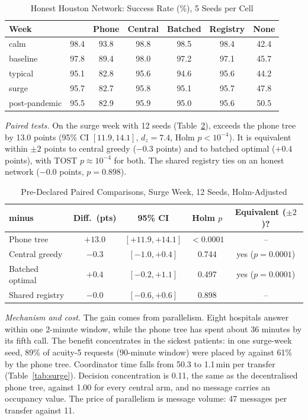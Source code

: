 \begin{table}[!t]
\centering
\caption{Honest Houston Network: Success Rate (\%), 5 Seeds per Cell}
\label{tab:honest}
\scriptsize
\setlength{\tabcolsep}{2.5pt}
\begin{tabular}{@{}lcccccc@{}}
\toprule
Week & \mahros{} & Phone & Central & Batched & Registry & None \\
\midrule
calm          & 98.4 & 93.8 & 98.8 & 98.5 & 98.4 & 42.4 \\
baseline      & 97.8 & 89.4 & 98.0 & 97.2 & 97.1 & 45.7 \\
typical       & 95.1 & 82.8 & 95.6 & 94.6 & 95.6 & 44.2 \\
surge         & 95.7 & 82.7 & 95.8 & 95.1 & 95.7 & 47.8 \\
post-pandemic & 95.5 & 82.9 & 95.9 & 95.0 & 95.6 & 50.5 \\
\bottomrule
\end{tabular}
\end{table}

\emph{Paired tests.} On the surge week with 12 seeds (Table~\ref{tab:sig}), \mahros{} exceeds the phone tree by 13.0 points (95\% CI $[11.9,14.1]$, $d_z=7.4$, Holm $p<10^{-4}$). It is equivalent within $\pm2$ points to central greedy ($-0.3$ points) and to batched optimal ($+0.4$ points), with TOST $p\approx10^{-4}$ for both. The shared registry ties \mahros{} on an honest network ($-0.0$ points, $p=0.898$).

\begin{table}[!t]
\centering
\caption{Pre-Declared Paired Comparisons, Surge Week, 12 Seeds, Holm-Adjusted}
\label{tab:sig}
\scriptsize
\setlength{\tabcolsep}{2pt}
\begin{tabular}{@{}lcccc@{}}
\toprule
\mahros{} minus & Diff.\ (pts) & 95\% CI & Holm $p$ & Equivalent ($\pm2$)? \\
\midrule
Phone tree      & $+13.0$ & $[+11.9, +14.1]$ & $<0.0001$ & -- \\
Central greedy  & $-0.3$  & $[-1.0, +0.4]$   & 0.744 & yes ($p=0.0001$) \\
Batched optimal & $+0.4$  & $[-0.2, +1.1]$   & 0.497 & yes ($p=0.0001$) \\
Shared registry & $-0.0$  & $[-0.6, +0.6]$   & 0.898 & -- \\
\bottomrule
\end{tabular}
\end{table}

\emph{Mechanism and cost.} The gain comes from parallelism. Eight hospitals answer within one 2-minute window, while the phone tree has spent about 36 minutes by its fifth call. The benefit concentrates in the sickest patients: in one surge-week seed, 89\% of acuity-5 requests (90-minute window) were placed by \mahros{} against 61\% by the phone tree. Coordinator time falls from 50.3 to 1.1\,min per transfer (Table~\ref{tab:surge}). Decision concentration is 0.11, the same as the decentralised phone tree, against 1.00 for every central arm, and no message carries an occupancy value. The price of parallelism is message volume: 47 messages per transfer against 11.


